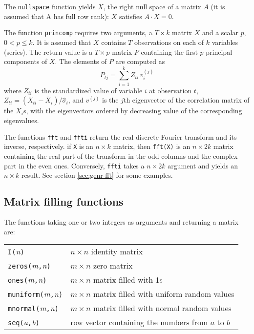 The \texttt{nullspace} function yields $X$, the right null space of a
matrix $A$ (it is assumed that A has full row rank): $X$ satisfies $A
\cdot X = 0$.

The function \texttt{princomp} requires two arguments, a $T \times k$
matrix $X$ and a scalar $p$, $0 < p \leq k$.  It is assumed that $X$
contains $T$ observations on each of $k$ variables (series).  The
return value is a $T \times p$ matrix $P$ containing the first $p$
principal components of $X$.  The elements of $P$ are computed as
\[
P_{tj} = \sum_{i=1}^{k} Z_{ti} \, v^{(j)}_i
\]
where $Z_{ti}$ is the standardized value of variable $i$ at
observation $t$, $Z_{ti} = (X_{ti} - \bar{X}_i) / \hat{\sigma}_i$, and
$v^{(j)}$ is the $j$th eigenvector of the correlation matrix of the
$X_i$s, with the eigenvectors ordered by decreasing value of the
corresponding eigenvalues.

The functions \texttt{fft} and \texttt{ffti} return the real discrete
Fourier transform and its inverse, respectively. if \texttt{X} is an $n
\times k$ matrix, then \texttt{fft(X)} is an $n \times 2k$ matrix
containing the real part of the transform in the odd columns and the
complex part in the even ones. Conversely, \texttt{ffti} takes a $n
\times 2k$ argument and yields an $n \times k$ result. See section
\ref{sec:genr-fft} for some examples.

\subsection{Matrix filling functions}
\label{matrix-fill}

The functions taking one or two integers as arguments and returning
a matrix are:

\begin{center}
\begin{tabular}{ll}
\texttt{I(}\textsl{n}\texttt{)} & $n\times n$ identity matrix \\
\texttt{zeros(}\textsl{m}\texttt{,}\textsl{n}\texttt{)} & 
   $m\times n$ zero matrix \\
\texttt{ones(}\textsl{m}\texttt{,}\textsl{n}\texttt{)} &
   $m\times n$ matrix filled with 1s \\
\texttt{muniform(}\textsl{m}\texttt{,}\textsl{n}\texttt{)} &
   $m\times n$ matrix filled with uniform random values \\
\texttt{mnormal(}\textsl{m}\texttt{,}\textsl{n}\texttt{)} &
   $m\times n$ matrix filled with normal random values \\
\texttt{seq(}\textsl{a}\texttt{,}\textsl{b}\texttt{)} &
   row vector containing the numbers from $a$ to $b$
\end{tabular}
\end{center}

